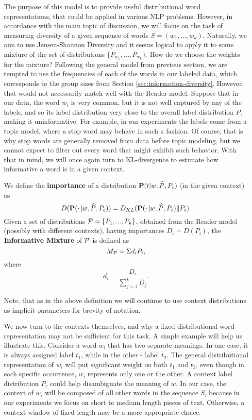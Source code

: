 The purpose of this model is to provide useful distributional
word representations, that could be applied in various NLP
problems. However, in accordance with the main topic of discussion, we will
focus on the task of measuring diversity of a given sequence of words
$S=(w_1,...,w_k)$. Naturally, we aim to use Jensen-Shannon Diversity
and it seems logical to apply it to some mixture of the set of
distributions $\{P_{w_1},...,P_{w_k}\}$. How do we choose the weights
for the mixture? Following the general model from previous section, we
are tempted to use the frequencies of each of the words in our labeled data,
which corresponds to the group sizes from Section
\ref{sec:information-diversity}. However, that would not 
necessarily match well with the Reader model. Suppose that in our
data, the word $w_i$ is very common, but it is not well captured by any of
the labels, and so its label distribution very close to the overall
label distribution $P$, making it uninformative. For example, in our
experiments the labels come from a topic model, where a stop word may
behave in such a fashion. Of course, that is why stop words are
generally removed from data before topic modeling, but we cannot
expect to filter out every word that might exhibit such behavior. With
that in mind, we will once again turn to KL-divergence to
estimate how informative a word is in a given context.

\bed
We define the {\bf importance} of a distribution $\operatorname{\mathbf{P}}(t|w,\widehat{P},P_c)$ (in 
the given context) as
\[D(\operatorname{\mathbf{P}}(\cdot\,|w,\widehat{P},P_c)) =
D_{KL}(\operatorname{\mathbf{P}}(\cdot\,|w,\widehat{P},P_c)\|P_c).\]
Given a set of distributions ${\mathcal P} = \{P_1,...,P_k\}$, obtained from the
Reader model (possibly with different contexts), having importances
$D_i=D(P_i)$, the {\bf Informative Mixture} of ${\mathcal P}$ is defined as
\[M_{{\mathcal P}} = \Sigma d_i P_i,\]
where
\[d_i = \frac{D_i}{\sum_{j=1}^k D_j}.\]
\eed

Note, that as in the above definition we will continue to use context
distributions as implicit parameters for brevity of notation.

We now turn to the contexts themselves, and why a fixed distributional
word representation may not be sufficient for this task. A simple example will
help us illustrate this. Consider a word $w_i$ that has
two separate meanings. In one case, it is always assigned label $t_1$,
while in the other - label $t_2$. The general distributional
representation of $w_i$ will put significant weight on both $t_1$ and
$t_2$, even though in each specific occurrence, $w_i$ represents only one
or the other. A context label distribution $P_c$ could help disambiguate
the meaning of $w$. In our case, the context of $w_i$ will be composed of
all other words in the sequence $S$, because in our experiments we
focus on short to medium length pieces of text. Otherwise, a context
window of fixed length may be a more appropriate choice.

